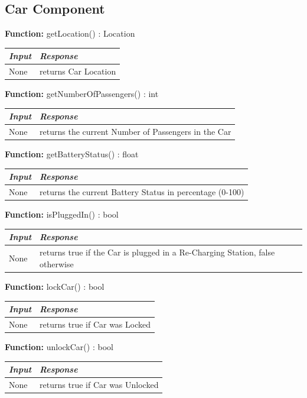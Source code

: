 \documentclass[a4paper]{article}
\begin{document}
\subsection{Car Component}
\textbf{Function:} getLocation() : Location \par
\begin{center}
\begin{tabular}{ | L{6cm} | L{6cm} | }
\hline
	\textit{Input}& \textit{Response}\\ \hline
	None & returns Car Location\\ \hline
\end{tabular}
\end{center}
\textbf{Function:} getNumberOfPassengers() : int \par
\begin{center}
\begin{tabular}{ | L{6cm} | L{6cm} | }
\hline
	\textit{Input}& \textit{Response}\\ \hline
	None & returns the current Number of Passengers in the Car\\ \hline
\end{tabular}
\end{center}
\textbf{Function:} getBatteryStatus() : float \par
\begin{center}
\begin{tabular}{ | L{6cm} | L{6cm} | }
\hline
	\textit{Input}& \textit{Response}\\ \hline
	None & returns the current Battery Status in percentage (0-100)\\ \hline
\end{tabular}
\end{center}
\textbf{Function:} isPluggedIn() : bool \par
\begin{center}
\begin{tabular}{ | L{6cm} | L{6cm} | }
\hline
	\textit{Input}& \textit{Response}\\ \hline
	None & returns true if the Car is plugged in a Re-Charging Station, false otherwise\\ \hline
\end{tabular}
\end{center}
\textbf{Function:} lockCar() : bool \par
\begin{center}
\begin{tabular}{ | L{6cm} | L{6cm} | }
\hline
	\textit{Input}& \textit{Response}\\ \hline
	None & returns true if Car was Locked\\ \hline
\end{tabular}
\end{center}
\textbf{Function:} unlockCar() : bool \par
\begin{center}
\begin{tabular}{ | L{6cm} | L{6cm} | }
\hline
	\textit{Input}& \textit{Response}\\ \hline
	None & returns true if Car was Unlocked\\ \hline
\end{tabular}
\end{center}
\newpage
\end{document}
